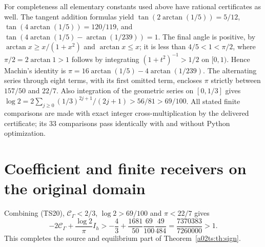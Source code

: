\documentclass[11pt,a4paper]{article}
\begin{document}
For completeness all elementary constants used above have rational
certificates as well. The tangent addition formulas yield
$\tan(2\arctan(1/5))=5/12$,
$\tan(4\arctan(1/5))=120/119$, and
$\tan(4\arctan(1/5)-\arctan(1/239))=1$.
The final angle is positive, by
$\arctan x\geq x/(1+x^2)$ and $\arctan x\leq x$;
it is less than $4/5<1<\pi/2$, where
$\pi/2=2\arctan1>1$ follows by integrating $(1+t^2)^{-1}>1/2$
on $[0,1)$. Hence Machin's identity is
$\pi=16\arctan(1/5)-4\arctan(1/239)$.
The alternating series through eight terms, with its first omitted
term, encloses $\pi$ strictly between $157/50$ and $22/7$.
Also integration of the geometric series on $[0,1/3]$ gives
$\log2=2\sum_{j\geq0}(1/3)^{2j+1}/(2j+1)>56/81>69/100$.
All stated finite comparisons are made with exact integer
cross-multiplication by the delivered certificate; its 33 comparisons
pass identically with and without Python optimization.

\section{Coefficient and finite receivers on the original domain}
Combining (TS20), $\mathcal C_\Gamma<2/3$, $\log2>69/100$ and
$\pi<22/7$ gives
\begin{equation}\tag{TS36}
 -2\mathcal C_\Gamma+\frac{\log2}{\pi}I_h
 >-\frac43+\frac{1681}{50}\frac{69}{100}\frac{49}{484}
 =\frac{7370383}{7260000}>1.
\end{equation}
This completes the source and equilibrium part of Theorem~\ref{a02ts:th:sign}.
\end{document}
